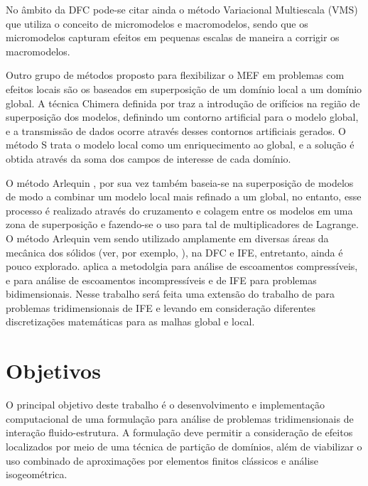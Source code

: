 \documentclass[tese_patricia.tex]{subfiles}
\begin{document}
No âmbito da DFC pode-se citar ainda o método Variacional Multiescala (VMS) \cite{Hughesetal:1998} que utiliza o conceito de micromodelos e macromodelos, sendo que os micromodelos capturam efeitos em pequenas escalas de maneira a corrigir os macromodelos.

Outro grupo de métodos proposto para flexibilizar o MEF em problemas com efeitos locais são os baseados em superposição de um domínio local a um domínio global. A técnica Chimera definida por  traz a introdução de orifícios na região de superposição dos modelos, definindo um contorno artificial para o modelo global, e a transmissão de dados ocorre através desses contornos artificiais gerados. O método S \cite{Fish:1992} trata o modelo local como um enriquecimento ao global, e a solução é obtida através da soma dos campos de interesse de cada domínio.

O método Arlequin \cite{Dhia:1998,DhiaR:2001}, por sua vez também baseia-se na superposição de modelos de modo a combinar um modelo local mais refinado a um global, no entanto, esse processo é realizado através do cruzamento e colagem entre os modelos em uma zona de superposição e fazendo-se o uso para tal de multiplicadores de Lagrange.  O método Arlequin vem sendo utilizado amplamente em diversas áreas da mecânica dos sólidos (ver, por exemplo, ), na DFC e IFE, entretanto, ainda é pouco explorado.  aplica a metodolgia para análise de escoamentos compressíveis, e  para análise de escoamentos incompressíveis e de IFE para problemas bidimensionais. Nesse trabalho será feita uma extensão do trabalho de   para problemas tridimensionais de IFE e levando em consideração diferentes discretizações matemáticas para as malhas global e local.


\section[Objetivos]{Objetivos}

O principal objetivo deste trabalho é o desenvolvimento e implementação computacional de uma formulação para análise de problemas tridimensionais de interação fluido-estrutura. A formulação deve permitir a consideração de efeitos localizados por meio de uma técnica de partição de domínios, além de viabilizar o uso combinado de aproximações por elementos finitos clássicos e análise isogeométrica.
\end{document}

